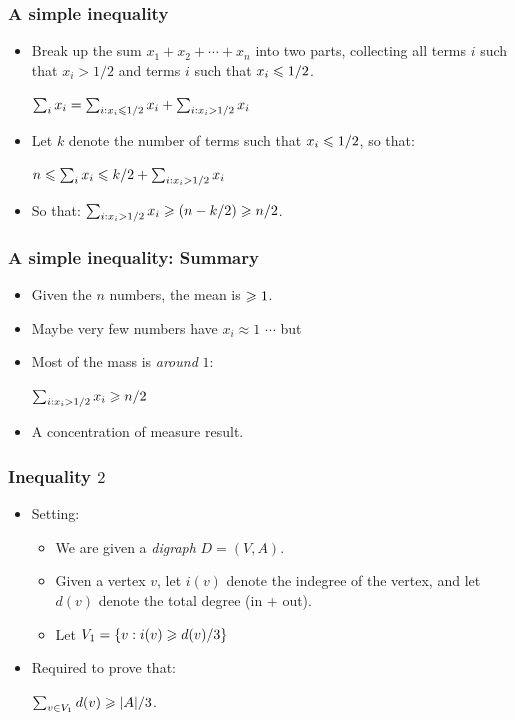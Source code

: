 \documentclass{beamer}
\begin{document}
\begin{frame}
\frametitle{A simple inequality}
\begin{itemize}
\item 
Break up the sum $x_1 + x_2 + \cdots + x_n$ into two parts, collecting all terms $i$ such that $x_i > 1/2$ and 
terms $i$ such that $x_i \leqslant 1/2$.
\begin{center}
$\sum_i x_i = \sum_{i: x_i \leqslant 1/2} x_i + \sum_{i: x_i > 1/2} x_i$
\end{center}
\item 
Let $k$ denote the number of terms such that $x_i \leqslant 1/2$, so that:
\begin{center}
$ n \leqslant \sum_i x_i \leqslant k/2 + \sum_{i: x_i > 1/2} x_i$
\end{center}
\pause
\item So that: $\sum_{i: x_i > 1/2} x_i \geqslant (n - k/2) \geqslant n/2$.
\end{itemize}
\end{frame}

\begin{frame}
\frametitle{A simple inequality: Summary}
\begin{itemize}
\item Given the $n$ numbers, the {\color{red} mean} is $\geqslant 1$. 
\item Maybe very few numbers have $x_i \approx 1$ $\cdots$ but \pause
\item Most of the {\color{blue} mass} is {\em around} $1$:
\begin{center}
$\sum_{i: x_i > 1/2} x_i \geqslant n/2$
\end{center}
\pause
\item A concentration of measure result. 
\end{itemize}
\end{frame}

\begin{frame}
\frametitle{Inequality $2$}
\begin{itemize}
\item Setting: 
\begin{itemize}
\item
We are given a {\em digraph} $D = (V, A)$. 
\item 
Given a vertex $v$, let $i(v)$ denote the 
indegree of the vertex, and let $d(v)$ denote the total degree (in + out). 
\item 
Let $V_1 = \{v : i(v) \geqslant d(v)/3\}$
\end{itemize}
\item Required to prove that: 
\begin{center}
$\sum_{v\in V_1} d(v) \geqslant |A|/3$. 
\end{center}
\end{itemize}
\end{frame}
\end{document}
